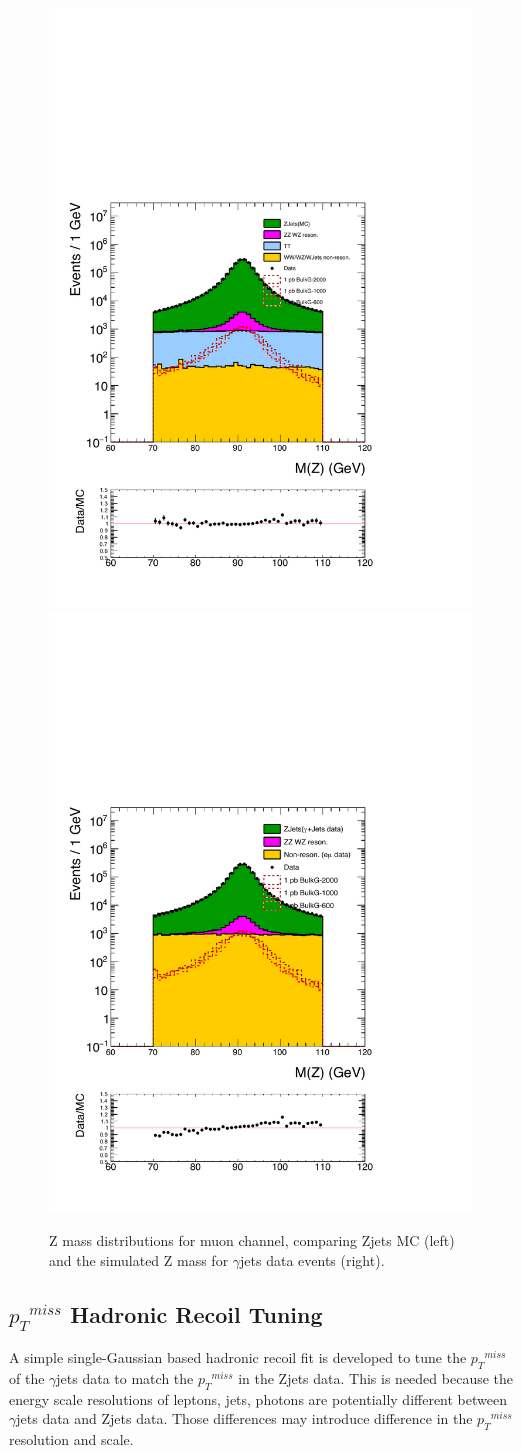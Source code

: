 \begin{figure}[htbp!]
\centering
\includegraphics[width=0.46\linewidth]{figures/MC2_Rc36p46DtReCalib_RhoWt_GMCEtaWt_tightzpt50_puWeightmoriondMC_metfilter_mu_log_1pb.pdf}
\includegraphics[width=0.46\linewidth]{figures/GJets2_BkgSub_Rc36p46DtReCalib_NonReso_RhoWt_GMCEtaWt_tightzpt50_puWeightmoriondMC_muoneg_gjet_metfilter_mu_log_1pb.pdf}
\caption{Z mass distributions for muon channel, comparing Zjets MC (left) and the simulated Z mass for $\gamma$jets data events (right).}
\label{fig:mz_mu_zjets_gjets}
\end{figure}

\subsection{${p_{T}}^{miss}$ Hadronic Recoil Tuning}
A simple single-Gaussian based hadronic recoil fit is developed to tune the ${p_{T}}^{miss}$ of the $\gamma$jets data to match the ${p_{T}}^{miss}$ in the Zjets data.
This is needed because the energy scale resolutions of leptons, jets, photons are potentially different between $\gamma$jets data and Zjets data. Those differences may introduce difference in the ${p_{T}}^{miss}$ resolution and scale. 

